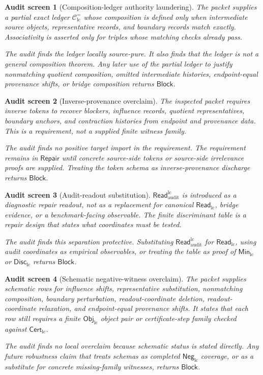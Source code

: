 \documentclass[11pt]{article}
\newcommand{\ObjLC}{\mathsf{Obj}_{\mathrm{lc}}}
\newcommand{\CertLC}{\mathsf{Cert}_{\mathrm{lc}}}
\newcommand{\ReadLC}{\mathsf{Read}_{\mathrm{lc}}}
\newcommand{\ReadAudit}{\mathsf{Read}_{\mathrm{audit}}^{\mathrm{lc}}}
\newcommand{\MinLC}{\mathsf{Min}_{\mathrm{lc}}}
\newcommand{\DiscLC}{\mathsf{Disc}_{\mathrm{lc}}}
\newcommand{\NegLC}{\mathsf{Neg}_{\mathrm{lc}}}
\newcommand{\Block}{\mathsf{Block}}
\newcommand{\Repair}{\mathsf{Repair}}
\newtheorem{screen}{Audit screen}
\begin{document}
\begin{screen}[Composition-ledger authority laundering]
The packet supplies a partial exact ledger
\(\mathcal{C}_{\mathrm{lc}}^{=}\) whose composition is defined only
when intermediate source objects, representative records, and boundary
records match exactly. Associativity is asserted only for triples whose
matching checks already pass.

The audit finds the ledger locally source-pure. It also finds that
the ledger is not a general composition theorem. Any later use of the
partial ledger to justify nonmatching quotient composition, omitted
intermediate histories, endpoint-equal provenance shifts, or bridge
composition returns \(\Block\).
\end{screen}

\begin{screen}[Inverse-provenance overclaim]
The inspected packet requires inverse tokens to recover blockers,
influence records, quotient representatives, boundary anchors, and
contraction histories from endpoint and provenance data. This is a
requirement, not a supplied finite witness family.

The audit finds no positive target import in the requirement. The
requirement remains in \(\Repair\) until concrete source-side tokens
or source-side irrelevance proofs are supplied. Treating the token
schema as inverse-provenance discharge returns \(\Block\).
\end{screen}

\begin{screen}[Audit-readout substitution]
\(\ReadAudit\) is introduced as a diagnostic repair readout, not as a
replacement for canonical \(\ReadLC\), bridge evidence, or a
benchmark-facing observable. The finite discriminant table is a repair
design that states what coordinates must be tested.

The audit finds this separation protective. Substituting
\(\ReadAudit\) for \(\ReadLC\), using audit coordinates as empirical
observables, or treating the table as proof of \(\MinLC\) or
\(\DiscLC\) returns \(\Block\).
\end{screen}

\begin{screen}[Schematic negative-witness overclaim]
The packet supplies schematic rows for influence shifts,
representative substitution, nonmatching composition, boundary
perturbation, readout-coordinate deletion, readout-coordinate
relaxation, and endpoint-equal provenance shifts. It states that each
row still requires a finite \(\ObjLC\) object pair or certificate-step
family checked against \(\CertLC\).

The audit finds no local overclaim because schematic status is stated
directly. Any future robustness claim that treats schemas as completed
\(\NegLC\) coverage, or as a substitute for concrete missing-family
witnesses, returns \(\Block\).
\end{screen}
\end{document}
